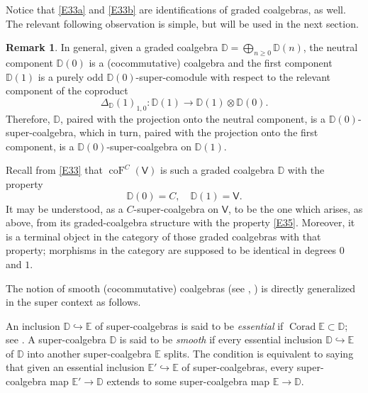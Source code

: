 \documentclass[11pt, a4paper]{amsart}
\theoremstyle{definition}
\newtheorem{rem}[theorem]{Remark}
\numberwithin{equation}{section}
\begin{document}
Notice that \eqref{E33a} and \eqref{E33b} are identifications of graded coalgebras, as well. 
The relevant following observation is simple, but will be used in the next section.

\begin{rem}\label{R32}
In general, given a graded coalgebra 
$\mathbb{D}= \bigoplus_{n \geq 0} \mathbb{D}(n)$, the neutral component $\mathbb{D}(0)$
is a (cocommutative) coalgebra and the first component $\mathbb{D}(1)$ is a purely odd $\mathbb{D}(0)$-super-comodule with respect to the relevant component of the coproduct 
\begin{equation}\label{E34}
\Delta_{\mathbb{D}}(1)_{1,0} : \mathbb{D}(1)\to \mathbb{D}(1)\otimes \mathbb{D}(0). 
\end{equation}
Therefore, $\mathbb{D}$, paired with the projection onto the neutral component, is a $\mathbb{D}(0)$-super-coalgebra,
which in turn, paired with the projection onto the
first component, is a $\mathbb{D}(0)$-super-coalgebra on $\mathbb{D}(1)$. 

Recall from \eqref{E33} that $\operatorname{coF}^{C}(\mathsf{V})$ is such a graded coalgebra $\mathbb{D}$ with the 
property 
\begin{equation}\label{E35}
\mathbb{D}(0)=C,\quad \mathbb{D}(1)=\mathsf{V}.
\end{equation}
It may be understood, as a $C$-super-coalgebra on $\mathsf{V}$, to be the one
which arises, as above, from its graded-coalgebra structure with the property \eqref{E35}. 
Moreover, it is a terminal object in the category of 
those graded coalgebras with that property; morphisms in the category are supposed to be identical in degrees
$0$ and $1$. 
\end{rem}

The notion of smooth (cocommutative) coalgebras (see \cite[p.1521, lines 5–7]{T0}, 
\cite[Definition 1.4, Proposition 1.5]{FS}) 
is directly generalized in the super context as follows. 

An inclusion $\mathbb{D}\hookrightarrow \mathbb{E}$ of super-coalgebras is said to be \emph{essential} 
if $\operatorname{Corad}\mathbb{E}\subset \mathbb{D}$; see \cite[Sect.~1]{MO}. 
A super-coalgebra $\mathbb{D}$ is said to be \emph{smooth}
if every essential inclusion $\mathbb{D}\hookrightarrow \mathbb{E}$ of $\mathbb{D}$ into another
super-coalgebra $\mathbb{E}$ splits. The condition is equivalent to saying that given an essential
inclusion $\mathbb{E}' \hookrightarrow \mathbb{E}$ of super-coalgebras, every super-coalgebra map 
$\mathbb{E}' \to \mathbb{D}$ extends to some super-coalgebra map $\mathbb{E} \to \mathbb{D}$.
\end{document}
